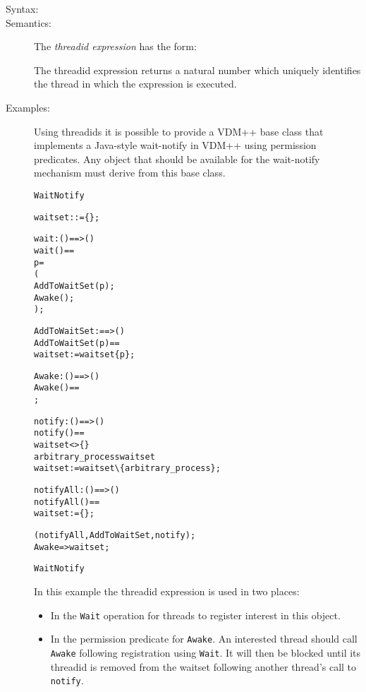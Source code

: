 \documentclass[\pformat,12pt]{article}
\begin{document}
\begin{description}
\item[Syntax:] 
  
\item[Semantics:] The {\it threadid expression} has the form:

  \begin{alltt}
  \end{alltt}
  The threadid expression returns a natural number which uniquely
  identifies the thread in which the expression is executed.

\item[Examples:] 
Using threadids it is possible to provide a VDM++ base class that
implements a Java-style wait-notify in VDM++ using permission
predicates. Any object that should be available for the wait-notify
mechanism must derive from this base class.  
\begin{alltt}
 WaitNotify

    waitset :  := \{\};

    \PROTECTED wait: () ==> ()
    wait() == 
       p = 
       (
        AddToWaitSet( p );
        Awake();
       );

    AddToWaitSet :  ==> ()
    AddToWaitSet( p ) ==
      waitset := waitset  \{ p \};
      
    Awake: () ==> ()
    Awake() == 
      ;
  
    \PROTECTED notify: () ==> ()
    notify() == 
         waitset <> \{\} 
           arbitrary_process  waitset
            waitset := waitset \verb+\+ \{arbitrary_process\};

    \PROTECTED notifyAll: () ==> ()
    notifyAll() ==
         waitset := \{\};

    (notifyAll, AddToWaitSet, notify);
     Awake =>  waitset;

 WaitNotify
\end{alltt}
In this example the threadid expression is used in two places:
\begin{itemize}
\item In the \texttt{Wait} operation for threads to register interest
  in this object.
\item In the permission predicate for \texttt{Awake}. An interested
  thread should call \texttt{Awake} following registration using
  \texttt{Wait}. It will then be blocked until its threadid is removed
  from the waitset following another thread's call to \texttt{notify}.
\end{itemize}


\end{description}
\end{document}
